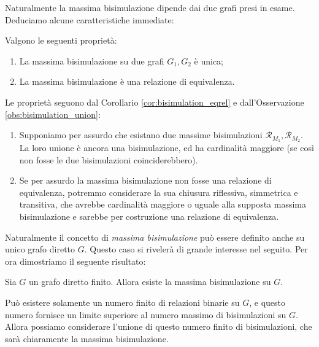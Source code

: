 Naturalmente la massima bisimulazione dipende dai due grafi presi in esame. Deduciamo alcune caratteristiche immediate:
\begin{proposition}
    Valgono le seguenti proprietà:
    \begin{enumerate}
        \item La massima bisimulazione su due grafi $G_1,G_2$ è unica;
        \item La massima bisimulazione è una relazione di equivalenza.
    \end{enumerate}
    \vspace*{-0.3cm}
    \label{prop:bisi_max_equi}
\end{proposition}
\begin{proof2}
    Le proprietà seguono dal Corollario \ref{cor:bisimulation_eqrel} e dall'Osservazione \ref{obs:bisimulation_union}:
    \begin{enumerate}
        \item Supponiamo per assurdo che esistano due massime bisimulazioni $\mathcal{R}_{M_1}, \mathcal{R}_{M_2}$. La loro unione è ancora una bisimulazione, ed ha cardinalità maggiore (se così non fosse le due bisimulazioni coinciderebbero).
        \item Se per assurdo la massima bisimulazione non fosse una relazione di equivalenza, potremmo considerare la sua chiusura riflessiva, simmetrica e transitiva, che avrebbe cardinalità maggiore o uguale alla supposta massima bisimulazione e sarebbe per costruzione una relazione di equivalenza.
    \end{enumerate}
    \vspace*{-0.7cm}
\end{proof2}
Naturalmente il concetto di \emph{massima bisimulazione} può essere definito anche su unico grafo diretto $G$. Questo caso si rivelerà di grande interesse nel seguito. Per ora dimostriamo il seguente risultato:
\begin{theorem}
    Sia $G$ un grafo diretto finito. Allora esiste la massima bisimulazione su $G$.
\end{theorem}
\begin{proof2}
    Può esistere solamente un numero finito di relazioni binarie su $G$, e questo numero fornisce un limite superiore al numero massimo di bisimulazioni su $G$.
    Allora possiamo considerare l'unione di questo numero finito di bisimulazioni, che sarà chiaramente la massima bisimulazione.
\end{proof2}

